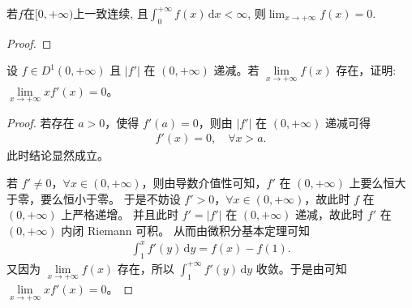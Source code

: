 \documentclass[../../main.tex]{subfiles}
\begin{document}
\begin{proposition}
若$f$在$[0, +\infty)$上一致连续, 且$\int_0^{+\infty} f(x) \, \mathrm{d}x < \infty$, 则$\lim_{x \to +\infty} f(x) = 0$.
\end{proposition}
\begin{proof}

\end{proof}

\begin{example}
设 \(f\in D^{1}(0,+\infty)\) 且 \(|f'|\) 在 \((0,+\infty)\) 递减。若 \(\lim\limits_{x \to +\infty} f(x)\) 存在，证明: \(\lim\limits_{x \to +\infty} x f'(x)=0\)。 
\end{example}
\begin{proof}
若存在 \(a > 0\)，使得 \(f'(a) = 0\)，则由 \(|f'|\) 在 \((0, +\infty)\) 递减可得
\begin{align*}
f'(x) = 0, \quad \forall x > a.
\end{align*}
此时结论显然成立。

若 \(f' \neq 0\)，\(\forall x \in (0, +\infty)\)，则由导数介值性可知，\(f'\) 在 \((0, +\infty)\) 上要么恒大于零，要么恒小于零。
于是不妨设 \(f' > 0\)，\(\forall x \in (0, +\infty)\)，故此时 \(f\) 在 \((0, +\infty)\) 上严格递增。
并且此时 \(f' = |f'|\) 在 \((0, +\infty)\) 递减，故此时 \(f'\) 在 \((0, +\infty)\) 内闭 Riemann 可积。
从而由微积分基本定理可知
\begin{align*}
\int_1^x f'(y) \, \mathrm{d}y = f(x) - f(1).
\end{align*}
又因为 \(\lim\limits_{x \to +\infty} f(x)\) 存在，所以 \(\int_1^{+\infty} f'(y) \, \mathrm{d}y\) 收敛。于是由可知 \(\lim\limits_{x \to +\infty} x f'(x) = 0\)。
\end{proof}
\end{document}
